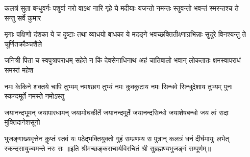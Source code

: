 \fourlineindentedshloka
{कलत्रं सुता बन्धुवर्गः पशुर्वा}
{नरो वाऽथ नारि गृहे ये मदीयाः}
{यजन्तो नमन्तः स्तुवन्तो भवन्तं}
{स्मरन्तश्च ते सन्तु सर्वे कुमार}

\fourlineindentedshloka
{मृगाः पक्षिणो दंशका ये च दुष्टाः}
{तथा व्याधयो बाधका ये मदङ्गे}
{भवच्छक्तितीक्ष्णाग्रभिन्नाः सुदूरे}
{विनश्यन्तु ते चूर्णितक्रौञ्चशैले}

\fourlineindentedshloka
{जनित्री पिता च स्वपुत्रापराधम्}
{सहेते न किं देवसेनाधिनाथ}
{अहं चातिबालो भवान् लोकतातः}
{क्षमस्वापराधं समस्तं महेश}

\fourlineindentedshloka
{नमः केकिने शक्तये चापि तुभ्यम्}
{नमश्छाग तुभ्यं नमः कुक्कुटाय}
{नमः सिन्धवे सिन्धुदेशाय तुभ्यम्}
{पुनः स्कन्दमूर्ते नमस्ते नमोऽस्तु}

\fourlineindentedshloka
{जयानन्दभूमन् जयापारधामन्}
{जयामोघकीर्ते जयानन्दमूर्ते}
{जयानन्दसिन्धो जयाशेषबन्धो}
{जय त्वं सदा मुक्तिदानेशसूनो}

\fourlineindentedshloka
{भुजङ्गाख्यवृत्तेन कॢप्तं स्तवं यः}
{पठेद्भक्तियुक्तो गुहं सम्प्रणम्य}
{स पुत्रान् कलत्रं धनं दीर्घमायुः}
{लभेत् स्कन्दसायुज्यमन्ते नरः सः}
॥इति  श्रीमच्छङ्कराचार्यविरचितं श्री सुब्रह्मण्यभुजङ्गं सम्पूर्णम्॥